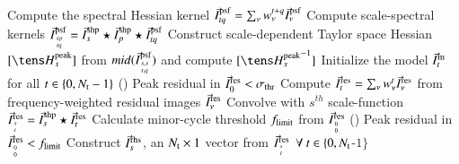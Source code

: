 \documentclass[11pt,a4paper,variablewidth]{article}
\begin{document}
\begin{algorithm}
  {
        { Compute the spectral Hessian kernel } $\vec{I}^{\rm psf}_{tq} = \sum_{\nu} {w_{\nu}^{t+q}} \vec{I}^{\rm psf}_{\nu}$\;
	{
		{Compute scale-spectral kernels} $\vec{I}^{\rm psf}_{{sp}\atop{tq}} = \vec{I}^{\rm shp}_s \star \vec{I}^{\rm shp}_p \star \vec{I}^{\rm psf}_{tq} $\;
	}
  }
  {
     Construct scale-dependent Taylor space Hessian $[{\He^{\rm peak}_s}]$ from $mid({\vec{I}}^{\rm psf}_{{s,s}\atop{t,q}})$ and compute $[{\He^{\rm peak}_s}^{-1}]$\;
  }
  Initialize the model $\vec{I}^{\rm m}_t$ for all $t \in \{0,N_{\rm t} -1\}$\; %
  \Repeat () { Peak residual in $\vec{I}^{\rm res}_0 < \sigma_{\rm thr}$ }
  {
    {
      Compute $\vec{I}^{\rm res}_t = \sum_{\nu} {w_{\nu}^t} \vec{I}^{\rm res}_{\nu}$ from frequency-weighted residual images ${\vec{I}}^{\rm res}_{\nu}$\;
      {
	    Convolve with $s^{th}$ scale-function $\vec{I}^{\rm res}_{{s}\atop{t}} = \vec{I}^{\rm shp}_s \star \vec{I}^{\rm res}_t$
      }
    }
    Calculate minor-cycle threshold $f_{\rm limit}$ from $\vec{I}^{\rm res}_{{0}\atop{0}}$\;
    \Repeat (){ Peak residual in $\vec{I}^{\rm res}_{{0}\atop{0}} < f_{\rm limit} $ } 
    {
     {
       {
          Construct ${\vec{I}}^{\rm rhs}_s$, an $N_{\rm t} \times 1$ vector from ${\vec{I}}^{\rm res}_{{s}\atop{t}} ~~\forall ~ t \in \{0,N_{\rm t} $-$1\}$\;
}}}}
\end{algorithm}
\end{document}
